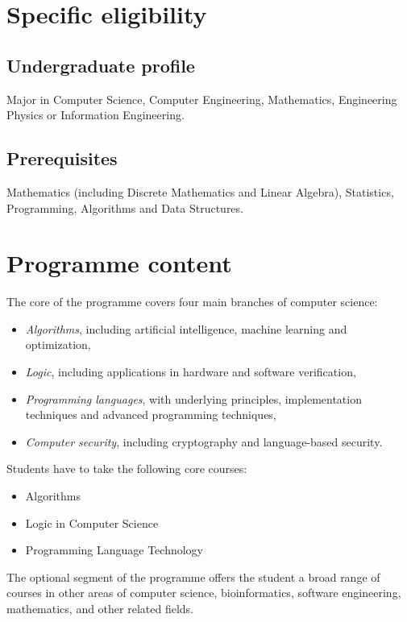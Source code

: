 \documentclass[11pt]{article}
\begin{document}
\section*{Specific eligibility}
\subsection*{Undergraduate profile}

Major in Computer Science, Computer Engineering, Mathematics, Engineering Physics or Information Engineering.
 
\subsection*{Prerequisites}

Mathematics (including Discrete Mathematics and Linear Algebra), Statistics, Programming, Algorithms and Data Structures.

\section*{Programme content}
 
The core of the programme covers four main branches of computer science:

\begin{itemize}
\item {\em Algorithms}, including artificial intelligence, machine learning 
and optimization,
\item {\em Logic}, including applications in hardware and software 
verification,
\item {\em Programming languages}, with underlying principles, implementation 
techniques and advanced programming techniques,
\item {\em Computer security}, including cryptography and language-based 
security. 
\end{itemize}

Students have to take the following core courses:

\begin{itemize}
\item Algorithms
\item Logic in Computer Science
\item Programming Language Technology
\end{itemize}

The optional segment of the programme offers the student a broad range of courses in other areas of computer science, bioinformatics, software engineering, mathematics, and other related fields.
 
\end{document}
